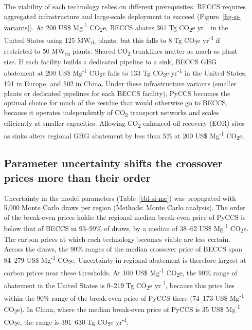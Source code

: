 \documentclass[
  letterpaper,
  twoside,
  twocolumn,
  9pt]{article}
\begin{document}
The viability of each technology relies on different prerequisites.
BECCS requires aggregated infrastructure and large-scale deployment to
succeed (Figure~\ref{fig-si-variants}). At 200 US\$
Mg\textsuperscript{-1} CO\textsubscript{2}e, BECCS abates 361 Tg
CO\textsubscript{2}e yr\textsuperscript{-1} in the United States using
125 MW\textsubscript{th} plants, but this falls to 8 Tg
CO\textsubscript{2}e yr\textsuperscript{-1} if restricted to 50
MW\textsubscript{th} plants. Shared CO\textsubscript{2} trunklines
matter as much as plant size. If each facility builds a dedicated
pipeline to a sink, BECCS GHG abatement at 200 US\$
Mg\textsuperscript{-1} CO\textsubscript{2}e falls to 133 Tg
CO\textsubscript{2}e yr\textsuperscript{-1} in the United States, 191 in
Europe, and 502 in China. Under these infrastructure variants (smaller
plants or dedicated pipelines for each BECCS facility), PyCCS becomes
the optimal choice for much of the residue that would otherwise go to
BECCS, because it operates independently of CO\textsubscript{2}
transport networks and scales efficiently at smaller capacities.
Allowing CO\textsubscript{2}-enhanced oil recovery (EOR) sites as sinks
alters regional GHG abatement by less than 5\% at 200 US\$
Mg\textsuperscript{-1} CO\textsubscript{2}e.

\subsection{Parameter uncertainty shifts the crossover prices more than
their
order}\label{parameter-uncertainty-shifts-the-crossover-prices-more-than-their-order}

Uncertainty in the model parameters (Table~\ref{tbl-si-mc}) was
propagated with 5,000 Monte Carlo draws per region (Methods: Monte Carlo
analysis). The order of the break-even prices holds: the regional median
break-even price of PyCCS is below that of BECCS in 93--99\% of draws,
by a median of 38--62 US\$ Mg\textsuperscript{-1} CO\textsubscript{2}e.
The carbon prices at which each technology becomes viable are less
certain. Across the draws, the 90\% ranges of the median crossover price
of BECCS span 84--279 US\$ Mg\textsuperscript{-1} CO\textsubscript{2}e.
Uncertainty in regional abatement is therefore largest at carbon prices
near these thresholds. At 100 US\$ Mg\textsuperscript{-1}
CO\textsubscript{2}e, the 90\% range of abatement in the United States
is 0--219 Tg CO\textsubscript{2}e yr\textsuperscript{-1}, because this
price lies within the 90\% range of the break-even price of PyCCS there
(74--173 US\$ Mg\textsuperscript{-1} CO\textsubscript{2}e). In China,
where the median break-even price of PyCCS is 35 US\$
Mg\textsuperscript{-1} CO\textsubscript{2}e, the range is 391--630 Tg
CO\textsubscript{2}e yr\textsuperscript{-1}.
\end{document}
